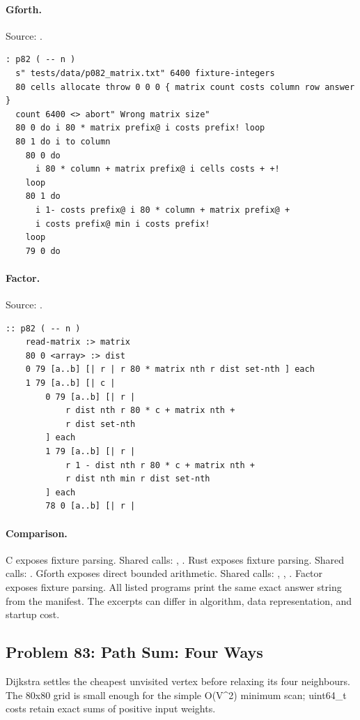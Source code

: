 \paragraph{Gforth.} Source: .
\begin{lstlisting}
: p82 ( -- n )
  s" tests/data/p082_matrix.txt" 6400 fixture-integers
  80 cells allocate throw 0 0 0 { matrix count costs column row answer }
  count 6400 <> abort" Wrong matrix size"
  80 0 do i 80 * matrix prefix@ i costs prefix! loop
  80 1 do i to column
    80 0 do
      i 80 * column + matrix prefix@ i cells costs + +!
    loop
    80 1 do
      i 1- costs prefix@ i 80 * column + matrix prefix@ +
      i costs prefix@ min i costs prefix!
    loop
    79 0 do
\end{lstlisting}

\paragraph{Factor.} Source: .
\begin{lstlisting}
:: p82 ( -- n )
    read-matrix :> matrix
    80 0 <array> :> dist
    0 79 [a..b] [| r | r 80 * matrix nth r dist set-nth ] each
    1 79 [a..b] [| c |
        0 79 [a..b] [| r |
            r dist nth r 80 * c + matrix nth +
            r dist set-nth
        ] each
        1 79 [a..b] [| r |
            r 1 - dist nth r 80 * c + matrix nth +
            r dist nth min r dist set-nth
        ] each
        78 0 [a..b] [| r |
\end{lstlisting}

\paragraph{Comparison.}
C exposes fixture parsing. Shared calls: \texttt{}, \texttt{}. Rust exposes fixture parsing. Shared calls: \texttt{}. Gforth exposes direct bounded arithmetic. Shared calls: \texttt{}, \texttt{}, \texttt{}. Factor exposes fixture parsing.
All listed programs print the same exact answer string from the manifest. The excerpts can differ in algorithm, data representation, and startup cost.

\subsection{Problem 83: Path Sum: Four Ways}
\label{walkthrough:p83}
Dijkstra settles the cheapest unvisited vertex before relaxing its four neighbours. The 80x80 grid is small enough for the simple O(V\textasciicircum{}2) minimum scan; uint64\_t costs retain exact sums of positive input weights.

